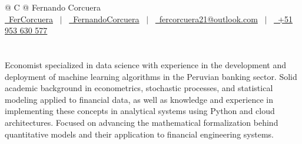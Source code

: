 \documentclass[9pt]{article}
\begin{document}
    
    \pagestyle{empty} 
    
    
    
    \begin{tabularx}{\linewidth}{@{} C @{}}
    \Huge{Fernando Corcuera} \\[6pt]
    \href{https://github.com/FerCorcuera}{\raisebox{-0.05\height}\faGithub\ FerCorcuera} \ $|$ \ 
    \href{https://linkedin.com/in/FernandoCorcuera}{\raisebox{-0.05\height}\faLinkedin\ FernandoCorcuera} \ $|$ \ 
    \href{mailto:fercorcuera@outlook.com}{\raisebox{-0.05\height}\faEnvelope \ fercorcuera21@outlook.com} \ $|$ \ 
    \href{tel:+000000000000}{\raisebox{-0.05\height}\faMobile \ +51 953 630 577} \\
    \end{tabularx}
    \vspace{-20pt}
    
    \section*{}
    Economist specialized in data science with experience in the development and deployment of machine learning algorithms in the Peruvian banking sector. Solid academic background in econometrics, stochastic processes, and statistical modeling applied to financial data, as well as knowledge and experience in implementing these concepts in analytical systems using Python and cloud architectures. Focused on advancing the mathematical formalization behind quantitative models and their application to financial engineering systems.
    \vspace{-4.5pt}
\end{document}
